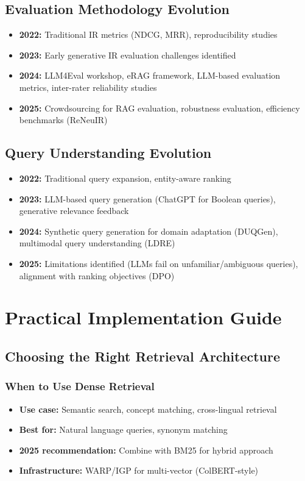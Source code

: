 \documentclass[11pt,letterpaper]{article}
\begin{document}
\subsection{Evaluation Methodology Evolution}

\begin{itemize}[leftmargin=*]
    \item \textbf{2022:} Traditional IR metrics (NDCG, MRR), reproducibility studies
    \item \textbf{2023:} Early generative IR evaluation challenges identified
    \item \textbf{2024:} LLM4Eval workshop, eRAG framework, LLM-based evaluation metrics, inter-rater reliability studies
    \item \textbf{2025:} Crowdsourcing for RAG evaluation, robustness evaluation, efficiency benchmarks (ReNeuIR)
\end{itemize}

\subsection{Query Understanding Evolution}

\begin{itemize}[leftmargin=*]
    \item \textbf{2022:} Traditional query expansion, entity-aware ranking
    \item \textbf{2023:} LLM-based query generation (ChatGPT for Boolean queries), generative relevance feedback
    \item \textbf{2024:} Synthetic query generation for domain adaptation (DUQGen), multimodal query understanding (LDRE)
    \item \textbf{2025:} Limitations identified (LLMs fail on unfamiliar/ambiguous queries), alignment with ranking objectives (DPO)
\end{itemize}

\section{Practical Implementation Guide}

\subsection{Choosing the Right Retrieval Architecture}

\subsubsection{When to Use Dense Retrieval}
\begin{itemize}[leftmargin=*]
    \item \textbf{Use case:} Semantic search, concept matching, cross-lingual retrieval
    \item \textbf{Best for:} Natural language queries, synonym matching
    \item \textbf{2025 recommendation:} Combine with BM25 for hybrid approach
    \item \textbf{Infrastructure:} WARP/IGP for multi-vector (ColBERT-style)
\end{itemize}
\end{document}
